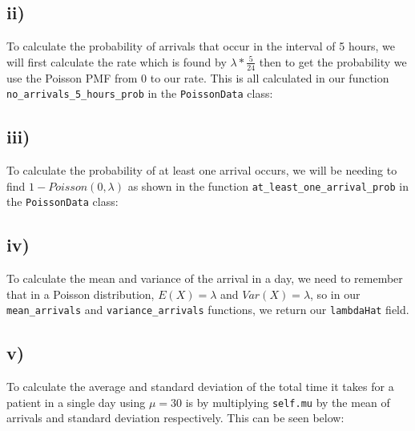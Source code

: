 \documentclass[11pt, letterpaper]{article}
\begin{document}
\begin{file}[q5.py i)]
	
\end{file}

\subsection*{ii)}

To calculate the probability of  arrivals that occur in the interval of 5
hours, we will first calculate the rate
which is found by $\lambda * \frac{5}{24}$ then to get the probability we use
the Poisson PMF from $0$ to our rate.
This is all calculated in our function \verb|no_arrivals_5_hours_prob| in the
\verb|PoissonData| class:

\begin{file}[q5.py ii)]
	
\end{file}

\subsection*{iii)}
To calculate the probability of at least one arrival occurs, we will be needing
to find $1-Poisson(0,\lambda)$ as
shown in the function \verb|at_least_one_arrival_prob| in the
\verb|PoissonData| class:

\begin{file}[q5.py iii)]
	
\end{file}

\subsection*{iv)}
To calculate the mean and variance of the arrival in a day, we need to remember
that in a Poisson distribution,
$E(X) = \lambda$ and $Var(X) = \lambda$, so in our \verb|mean_arrivals| and
\verb|variance_arrivals| functions, we
return our \verb|lambdaHat| field.

\begin{file}[q5.py]
	
\end{file}

\subsection*{v)}
To calculate the average and standard deviation of the total time it takes
for a patient in a single day using $\mu = 30$ is by multiplying \verb|self.mu|
by the mean
of arrivals and standard deviation respectively. This can be seen below:
\end{document}
